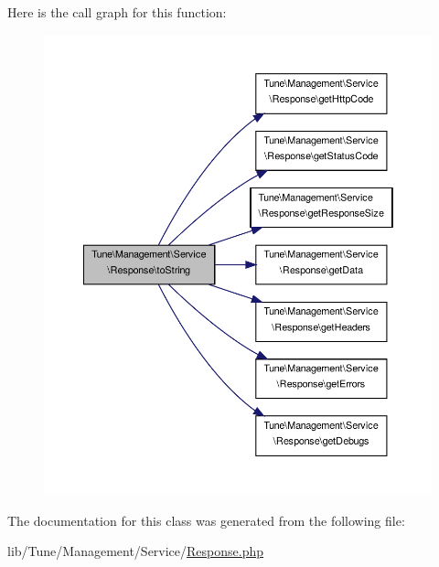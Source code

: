 Here is the call graph for this function\-:
\nopagebreak
\begin{figure}[H]
\begin{center}
\leavevmode
\includegraphics[width=350pt]{classTune_1_1Management_1_1Service_1_1Response_ad03514e776620bd3e41da951325db7fe_cgraph}
\end{center}
\end{figure}




The documentation for this class was generated from the following file\-:\begin{DoxyCompactItemize}
\item 
lib/\-Tune/\-Management/\-Service/\hyperlink{Response_8php}{Response.\-php}\end{DoxyCompactItemize}
